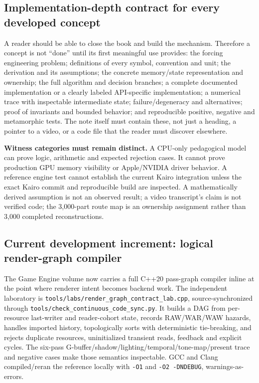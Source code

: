 \subsection{Implementation-depth contract for every developed concept}\label{implementation-depth-contract-for-every-developed-concept}

A reader should be able to close the book and build the mechanism. Therefore a concept is not ``done'' until its first meaningful use provides: the forcing engineering problem; definitions of every symbol, convention and unit; the derivation and its assumptions; the concrete memory/state representation and ownership; the full algorithm and decision branches; a complete documented implementation or a clearly labeled API-specific implementation; a numerical trace with inspectable intermediate state; failure/degeneracy and alternatives; proof of invariants and bounded behavior; and reproducible positive, negative and metamorphic tests. The note itself must contain these, not just a heading, a pointer to a video, or a code file that the reader must discover elsewhere.

\textbf{Witness categories must remain distinct.} A CPU-only pedagogical model can prove logic, arithmetic and expected rejection cases. It cannot prove production GPU memory visibility or Apple/NVIDIA driver behavior. A reference engine test cannot establish the current Kairo integration unless the exact Kairo commit and reproducible build are inspected. A mathematically derived assumption is not an observed result; a video transcript's claim is not verified code; the 3,000-part route map is an ownership assignment rather than 3,000 completed reconstructions.

\subsection{Current development increment: logical render-graph compiler}\label{current-development-increment-logical-render-graph-compiler}

The Game Engine volume now carries a full C++20 pass-graph compiler inline at the point where renderer intent becomes backend work. The independent laboratory is \texttt{tools/labs/render\_graph\_contract\_lab.cpp}, source-synchronized through \texttt{tools/check\_continuous\_code\_sync.py}. It builds a DAG from per-resource last-writer and reader-cohort state, records RAW/WAR/WAW hazards, handles imported history, topologically sorts with deterministic tie-breaking, and rejects duplicate resources, uninitialized transient reads, feedback and explicit cycles. The six-pass G-buffer/shadow/lighting/temporal/tone-map/present trace and negative cases make those semantics inspectable. GCC and Clang compiled/reran the reference locally with \texttt{-O1} and \texttt{-O2\ -DNDEBUG}, warnings-as-errors.

